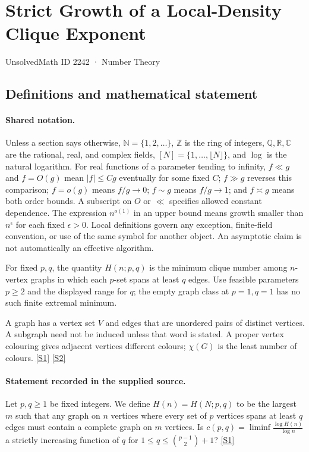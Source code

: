 \documentclass[11pt,a4paper]{article}
\newcommand{\N}{\mathbb{N}}
\newcommand{\Z}{\mathbb{Z}}
\newcommand{\Q}{\mathbb{Q}}
\newcommand{\R}{\mathbb{R}}
\newcommand{\C}{\mathbb{C}}
\newcommand{\sref}[2]{\hyperlink{source:#1:#2}{[S#2]}}
\begin{document}

\setcounter{section}{2241}

\section{Strict Growth of a Local-Density Clique Exponent}\label{2242}

{\small\sffamily UnsolvedMath ID 2242 · Number Theory}

\subsection{Definitions and mathematical statement}

\paragraph{Shared notation.}Unless a section says otherwise, $\N=\{1,2,\ldots\}$,
$\Z$ is the ring of integers, $\Q,\R,\C$ are the rational, real, and complex
fields, $[N]=\{1,\ldots,\lfloor N\rfloor\}$, and $\log$ is the natural
logarithm. For real functions of a parameter tending to infinity,
$f\ll g$ and $f=O(g)$ mean $|f|\leq Cg$ eventually for some fixed $C$;
$f\gg g$ reverses this comparison; $f=o(g)$ means $f/g\to0$;
$f\sim g$ means $f/g\to1$; and $f\asymp g$ means both order bounds.
A subscript on $O$ or $\ll$ specifies allowed constant dependence.
The expression $n^{o(1)}$ in an upper bound means growth smaller than
$n^\epsilon$ for each fixed $\epsilon>0$. Local definitions govern any
exception, finite-field convention, or use of the same symbol for another
object. An asymptotic claim is not automatically an effective algorithm.



For fixed $p,q$, the quantity $H(n;p,q)$ is the minimum clique number among $n$-vertex graphs in which each $p$-set spans at least $q$ edges. Use feasible parameters $p\geq2$ and the displayed range for $q$; the empty graph class at $p=1,q=1$ has no such finite extremal minimum.

A graph has a vertex set $V$ and edges that are unordered pairs of distinct vertices. A subgraph need not be induced unless that word is stated. A proper vertex colouring gives adjacent vertices different colours; $\chi(G)$ is the least number of colours. \sref{2242}{1} \sref{2242}{2}

\paragraph{Statement recorded in the supplied source.}
Let $p,q\geq 1$ be fixed integers. We define $H(n)=H(N;p,q)$ to be the largest $m$ such that any graph on $n$ vertices where every set of $p$ vertices spans at least $q$ edges must contain a complete graph on $m$ vertices.
Is $ c(p,q)=\liminf \frac{\log H(n)}{\log n} $ a strictly increasing function of $q$ for $1\leq q\leq \binom{p-1}{2}+1$? \sref{2242}{1}
\end{document}
